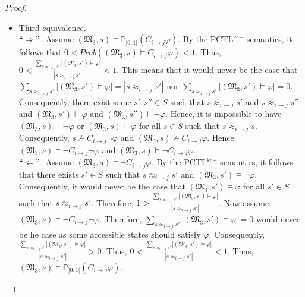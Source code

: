 \begin{proof}
\begin{itemize}
\item Third equivalence. ~\\
    $``\Rightarrow"$. Assume $(\mathfrak{M_3},s)\models \mathbb{P}_{]0,1[} (C_{i \rightarrow j}\varphi)$. By the PCTL$^{\textrm{kc+}}$ semantics, it follows that $0< Prob((\mathfrak{M_3},s)\models C_{i\rightarrow j}\varphi)<1$. Thus, $0<\frac{\sum_{s\approx_{i \rightarrow j}s'}|(\mathfrak{M_3},s')\models \varphi| }{|s \approx_{i \rightarrow j}s'|}<1$.
    This means that it would never be the case that $\sum_{s\approx_{i \rightarrow j}s'}|(\mathfrak{M_3},s')\models \varphi| = |s\approx_{i \rightarrow j}s'|$
    nor $\sum_{s\approx_{i \rightarrow j}s'}|(\mathfrak{M_3},s')\models \varphi| = 0$. Consequently, there exist some $s', s'' \in S$
    such that $s\approx_{i \rightarrow j}s'$ and $s\approx_{i \rightarrow j}s''$ and $(\mathfrak{M_3},s')\models \varphi$ and $(\mathfrak{M_3},s'')\models \neg \varphi$.
    Hence, it is impossible to have $(\mathfrak{M_3},\overline{s})\models \neg\varphi$ or $(\mathfrak{M_3},\overline{s})\models \varphi$ for all $\overline{s}\in S$ such that $s\approx_{i \rightarrow j}\overline{s}$. Consequently,
    $s\nvDash  C_{i \rightarrow j}\neg\varphi$ and  $(\mathfrak{M_3},s)\nvDash  C_{i \rightarrow j}\varphi$. Hence $(\mathfrak{M_3},s)\models \neg C_{i \rightarrow j}\neg\varphi$ and $(\mathfrak{M_3},s)\models \neg C_{i \rightarrow j}\varphi$. ~\\
    $``\Leftarrow"$. Assume $(\mathfrak{M_3},s)\models \neg C_{i \rightarrow j}\varphi$. By the PCTL$^{\textrm{kc+}}$ semantics, it follows that there exists $s'\in S$ such that $s\approx_{i \rightarrow j}s'$ and $(\mathfrak{M_3},s')\models \neg \varphi$. Consequently, it would never be the case that $(\mathfrak{M_3},s')\models \varphi$ for all $s'\in S$
    such that $s\approx_{i \rightarrow j}s'$. Therefore,
    $1>\frac{\sum_{s\approx_{i \rightarrow j}s'}|(\mathfrak{M_3},s')\models \varphi| }{|s\approx_{i \rightarrow j}s'|}$.
    Now assume $(\mathfrak{M_3},s)\models \neg C_{i \rightarrow j}\neg \varphi$. Therefore, $\sum_{s\approx_{i \rightarrow j}s'}|(\mathfrak{M_3},s')\models \varphi| = 0$ would never be he case as some accessible states should satisfy $\varphi$. Consequently,
    $\frac{\sum_{s\approx_{i \rightarrow j}s'}|(\mathfrak{M_3},s')\models \varphi| }{|s\approx_{i \rightarrow j}s'|}>0$.
    Thus, $0<\frac{\sum_{s\approx_{i \rightarrow j}s'}|(\mathfrak{M_3},s')\models \varphi| }{|s \approx_{i \rightarrow j}s'|}<1$. Thus, $(\mathfrak{M_3},s)\models \mathbb{P}_{]0,1[} (C_{i \rightarrow j}\varphi)$.
\end{itemize}

\end{proof}


